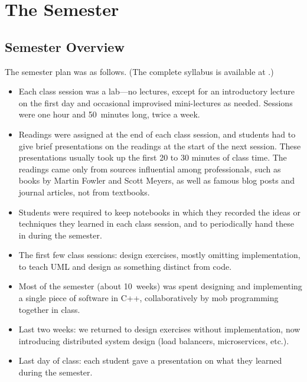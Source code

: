 \documentclass{article}
\begin{document}
\section{The Semester}

\begin{comment}
Solution: I took the union of all theories of design, and announced on
the first day that the entire field of software design is a matter of
opinion (including this very statement). %


\end{comment}

\subsection{Semester Overview}

The semester plan was as follows. (The complete syllabus is available at
\cite{kovitz2025cs356syllabus}.)

\begin{itemize}
\item Each class session was a lab---no lectures, except for an introductory
lecture on the first day and occasional improvised mini-lectures as needed.
Sessions were one hour and 50~minutes long, twice a week.

\item Readings were assigned at the end of each class session, and students
had to give brief presentations on the readings at the start of the next
session. These presentations usually took up the first 20 to 30 minutes of
class time. The readings came only from sources influential among
professionals, such as books by Martin Fowler and Scott Meyers, as well as
famous blog posts and journal articles, not from textbooks.

\item Students were required to keep notebooks in which they recorded the
ideas or techniques they learned in each class session, and to periodically hand
these in during the semester.

\item The first few class sessions: design exercises, mostly omitting
implementation, to teach UML and design as something distinct from code.

\item Most of the semester (about 10~weeks) was spent designing and
implementing a single piece of software in C++, collaboratively by mob
programming together in class.

\item Last two weeks: we returned to design exercises without implementation,
now introducing distributed system design (load balancers, microservices,
etc.).

\item Last day of class: each student gave a presentation on what they learned
during the semester.
\end{itemize}
\end{document}
